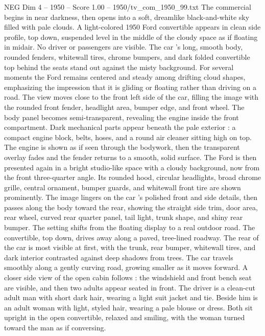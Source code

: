 \begin{textsample}{NEG Dim 4 – 1950 – Score 1.00 – 1950/tv\_com\_1950\_99.txt}  \label{ex:f4_neg_069}
The commercial begins in near darkness, then opens into a soft, dreamlike black-and-white sky filled with pale clouds.
A light-colored 1950 Ford convertible appears in clean side profile, top down, suspended level in the middle of the cloudy space as if floating in midair.
No driver or passengers are visible.
The car ’s long, smooth body, rounded fenders, whitewall tires, chrome bumpers, and dark folded convertible top behind the seats stand out against the misty background.
For several moments the Ford remains centered and steady among drifting cloud shapes, emphasizing the impression that it is gliding or floating rather than driving on a road.
The view moves close to the front left side of the car, filling the image with the rounded front fender, headlight area, bumper edge, and front wheel.
The body panel becomes semi-transparent, revealing the engine inside the front compartment.
Dark mechanical parts appear beneath the pale exterior : a compact engine block, belts, hoses, and a round air cleaner sitting high on top.
The engine is shown as if seen through the bodywork, then the transparent overlay fades and the fender returns to a smooth, solid surface.
The Ford is then presented again in a bright studio-like space with a cloudy background, now from the front three-quarter angle.
Its rounded hood, circular headlights, broad chrome grille, central ornament, bumper guards, and whitewall front tire are shown prominently.
The image lingers on the car ’s polished front and side details, then passes along the body toward the rear, showing the straight side trim, door area, rear wheel, curved rear quarter panel, tail light, trunk shape, and shiny rear bumper.
The setting shifts from the floating display to a real outdoor road.
The convertible, top down, drives away along a paved, tree-lined roadway.
The rear of the car is most visible at first, with the trunk, rear bumper, whitewall tires, and dark interior contrasted against deep shadows from trees.
The car travels smoothly along a gently curving road, growing smaller as it moves forward.
A closer side view of the open cabin follows : the windshield and front bench seat are visible, and then two adults appear seated in front.
The driver is a clean-cut adult man with short dark hair, wearing a light suit jacket and tie.
Beside him is an adult woman with light, styled hair, wearing a pale blouse or dress.
Both sit upright in the open convertible, relaxed and smiling, with the woman turned toward the man as if conversing.

\end{textsample}
